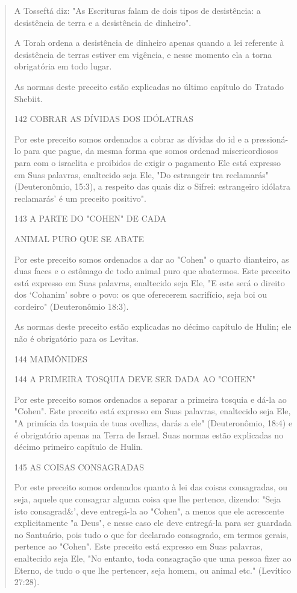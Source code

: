 \begin{quote}
A Tosseftá diz: "As Escrituras falam de dois tipos de desistência: a
desistência de terra e a desistência de dinheiro".

A Torah ordena a desistência de dinheiro apenas quando a lei refe­rente
à desistência de terras estiver em vigência, e nesse momento ela a torna
obrigatória em todo lugar.

As normas deste preceito estão explicadas no último capítulo do Tra­tado
Shebiit.

142 COBRAR AS DÍVIDAS DOS IDÓLATRAS

Por este preceito somos ordenados a cobrar as dívidas do id e a
pressioná-lo para que pague, da mesma forma que somos ordenad
misericordiosos para com o israelita e proibidos de exigir o pagamento
Ele está expresso em Suas palavras, enaltecido seja Ele, "Do estrangeir
tra reclamarás" (Deuteronômio, 15:3), a respeito das quais diz o Sifrei:
estrangeiro idólatra reclamarás' é um preceito positivo".

143 A PARTE DO "COHEN" DE CADA

ANIMAL PURO QUE SE ABATE

Por este preceito somos ordenados a dar ao "Cohen" o quarto dian­teiro,
as duas faces e o estômago de todo animal puro que abatermos. Este
pre­ceito está expresso em Suas palavras, enaltecido seja Ele, "E este
será o direito dos `Cohanim' sobre o povo: os que oferecerem sacrifício,
seja boi ou cordei­ro" (Deuteronômio 18:3).

As normas deste preceito estão explicadas no décimo capítulo de Hu­lin;
ele não é obrigatório para os Levitas.

144 MAIMÔNIDES

144 A PRIMEIRA TOSQUIA DEVE SER DADA AO "COHEN"

Por este preceito somos ordenados a separar a primeira tosquia e dá-la
ao "Cohen". Este preceito está expresso em Suas palavras, enaltecido
seja Ele, "A primícia da tosquia de tuas ovelhas, darás a ele"
(Deuteronômio, 18:4) e é obrigatório apenas na Terra de Israel. Suas
normas estão explicadas no décimo primeiro capítulo de Hulin.

145 AS COISAS CONSAGRADAS

Por este preceito somos ordenados quanto à lei das coisas consagra­das,
ou seja, aquele que consagrar alguma coisa que lhe pertence, dizendo:
"Seja isto consagrad\&', deve entregá-la ao "Cohen", a menos que ele
acrescente ex­plicitamente "a Deus", e nesse caso ele deve entregá-la
para ser guardada no Santuário, pois tudo o que for declarado
consagrado, em termos gerais, perten­ce ao "Cohen". Este preceito está
expresso em Suas palavras, enaltecido seja Ele, "No entanto, toda
consagração que uma pessoa fizer ao Eterno, de tudo o que lhe pertencer,
seja homem, ou animal etc." (Levítico 27:28).


\end{quote}
